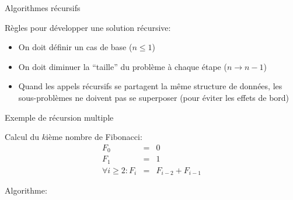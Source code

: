 \begin{frame}{Algorithmes récursifs}

\begin{center}
\end{center}

\bigskip

Règles pour développer une solution récursive:
\bigskip
\begin{itemize}
\item On doit définir un cas de base ($n\leq1$)
\item On doit diminuer la ``taille'' du problème à chaque étape ($n\rightarrow n-1$)
\item Quand les appels récursifs se partagent la même structure de données, les sous-problèmes ne doivent pas se superposer (pour éviter les effets de bord)
\end{itemize}
\end{frame}

\begin{frame}{Exemple de récursion multiple}

Calcul du $k$ième nombre de Fibonacci:
\begin{eqnarray*}
F_0&=&0\\
F_1&=&1\\
\forall i\geq 2: F_i& = &F_{i-2}+F_{i-1}
\end{eqnarray*}

Algorithme:
\begin{center}
\end{center}

\end{frame}

